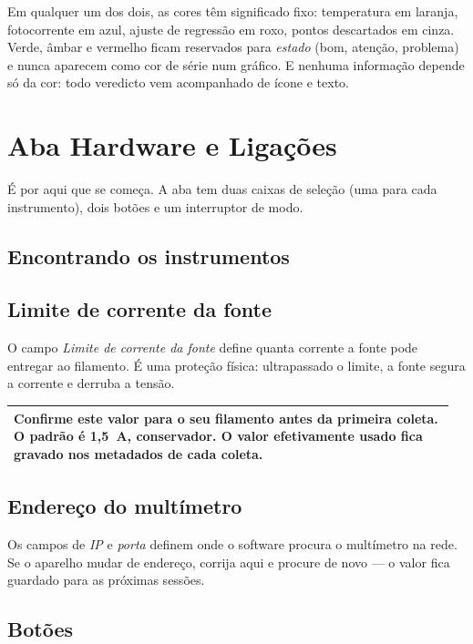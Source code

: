 \documentclass[11pt,a4paper]{article}
\newcommand{\campo}[1]{\textsf{\textit{#1}}}
\newenvironment{aviso}
  {\par\medskip\noindent\begin{tabular}{|p{0.96\linewidth}|}\hline\rule{0pt}{3ex}}
  {\\[1ex]\hline\end{tabular}\par\medskip}
\begin{document}
Em qualquer um dos dois, as cores têm significado fixo: temperatura em laranja,
fotocorrente em azul, ajuste de regressão em roxo, pontos descartados em cinza.
Verde, âmbar e vermelho ficam reservados para \emph{estado} (bom, atenção,
problema) e nunca aparecem como cor de série num gráfico. E nenhuma informação
depende só da cor: todo veredicto vem acompanhado de ícone e texto.

\section{Aba Hardware e Ligações}

É por aqui que se começa. A aba tem duas caixas de seleção (uma para cada
instrumento), dois botões e um interruptor de modo.

\subsection{Encontrando os instrumentos}

\subsection{Limite de corrente da fonte}

O campo \campo{Limite de corrente da fonte} define quanta corrente a fonte
pode entregar ao filamento. É uma proteção física: ultrapassado o limite, a
fonte segura a corrente e derruba a tensão.

\begin{aviso}
\textbf{Confirme este valor para o seu filamento antes da primeira coleta.} O
padrão é 1,5~A, conservador. O valor efetivamente usado fica gravado nos
metadados de cada coleta.
\end{aviso}

\subsection{Endereço do multímetro}

Os campos de \campo{IP} e \campo{porta} definem onde o software procura o
multímetro na rede. Se o aparelho mudar de endereço, corrija aqui e procure de
novo --- o valor fica guardado para as próximas sessões.

\subsection{Botões}
\end{document}
